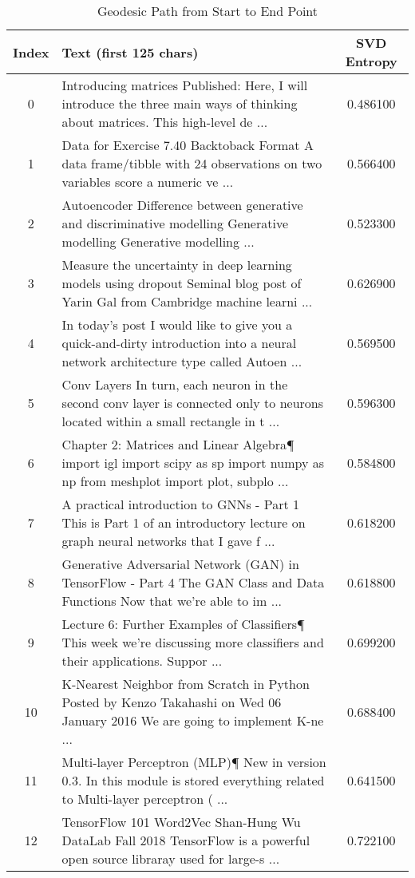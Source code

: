 \begin{table}[htbp]
\caption{Geodesic Path from Start to End Point}
\label{tab:geodesic_path}
\begin{tabular}{|c|p{12cm}|c|}
\toprule
Index & Text (first 125 chars) & SVD Entropy \\
\midrule
0 &  Introducing matrices  Published:  Here, I will introduce the three main ways of thinking about matrices. This high-level de ... & 0.486100 \\
1 & Data for Exercise 7.40  Backtoback   Format  A data frame/tibble with 24 observations on two variables  score  a numeric ve ... & 0.566400 \\
2 &  Autoencoder   Difference between generative and discriminative modelling   Generative modelling  Generative modelling  ... & 0.523300 \\
3 &  Measure the uncertainty in deep learning models using dropout  Seminal blog post of Yarin Gal from Cambridge machine learni ... & 0.626900 \\
4 & In today’s post I would like to give you a quick-and-dirty introduction into a neural network architecture type called Autoen ... & 0.569500 \\
5 & Conv Layers  In turn, each neuron in the second conv layer is connected only to neurons located within a small rectangle in t ... & 0.596300 \\
6 &  Chapter 2: Matrices and Linear Algebra¶  import igl import scipy as sp import numpy as np from meshplot import plot, subplo ... & 0.584800 \\
7 &  A practical introduction to GNNs - Part 1  This is Part 1 of an introductory lecture on graph neural networks that I gave f ... & 0.618200 \\
8 &  Generative Adversarial Network (GAN) in TensorFlow - Part 4   The GAN Class and Data Functions  Now that we’re able to im ... & 0.618800 \\
9 &  Lecture 6: Further Examples of Classifiers¶  This week we're discussing more classifiers and their applications.   Suppor ... & 0.699200 \\
10 &  K-Nearest Neighbor from Scratch in Python  Posted by Kenzo Takahashi on Wed 06 January 2016  We are going to implement K-ne ... & 0.688400 \\
11 &  Multi-layer Perceptron (MLP)¶  New in version 0.3.  In this module is stored everything related to Multi-layer perceptron ( ... & 0.641500 \\
12 &  TensorFlow 101  Word2Vec  Shan-Hung Wu  DataLab Fall 2018  TensorFlow is a powerful open source libraray used for large-s ... & 0.722100 \\

\end{tabular}
\end{table}
